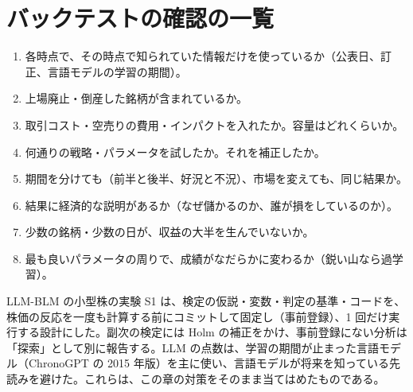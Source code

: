 \section{バックテストの確認の一覧}

\begin{keybox}[バックテストを信じる前に確かめること]
\begin{enumerate}
\item 各時点で、その時点で知られていた情報だけを使っているか（公表日、訂正、言語モデルの学習の期間）。
\item 上場廃止・倒産した銘柄が含まれているか。
\item 取引コスト・空売りの費用・インパクトを入れたか。容量はどれくらいか。
\item 何通りの戦略・パラメータを試したか。それを補正したか。
\item 期間を分けても（前半と後半、好況と不況）、市場を変えても、同じ結果か。
\item 結果に経済的な説明があるか（なぜ儲かるのか、誰が損をしているのか）。
\item 少数の銘柄・少数の日が、収益の大半を生んでいないか。
\item 最も良いパラメータの周りで、成績がなだらかに変わるか（鋭い山なら過学習）。
\end{enumerate}
\end{keybox}

\begin{projbox}
LLM-BLM の小型株の実験 S1 は、検定の仮説・変数・判定の基準・コードを、株価の反応を一度も計算する前にコミットして固定し（事前登録）、1 回だけ実行する設計にした。副次の検定には Holm の補正をかけ、事前登録にない分析は「探索」として別に報告する。LLM の点数は、学習の期間が止まった言語モデル（ChronoGPT の 2015 年版）を主に使い、言語モデルが将来を知っている先読みを避けた。これらは、この章の対策をそのまま当てはめたものである。
\end{projbox}
